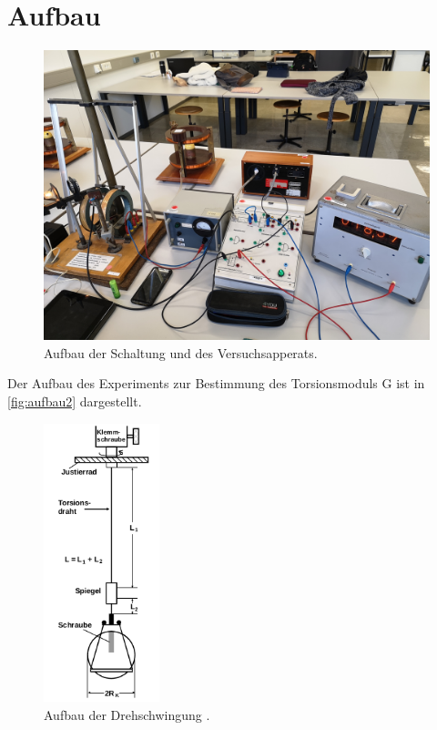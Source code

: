 \newpage
\section{Aufbau}
\label{sec:aufbau}

\begin{figure}
    \centering
    \includegraphics[scale=0.1]{content/Bilder/Aufbau.jpg}
    \caption{Aufbau der Schaltung und des Versuchsapperats.}
    \label{fig:aufbau}
\end{figure}
Der Aufbau des Experiments zur Bestimmung des Torsionsmoduls G ist in \autoref{fig:aufbau2} dargestellt.
\begin{figure}
    \centering
    \includegraphics[width=0.3\textwidth]{content/Bilder/Torsion.png}
    \caption{Aufbau der Drehschwingung \cite{v102}.}
    \label{fig:aufbau2}
\end{figure}
